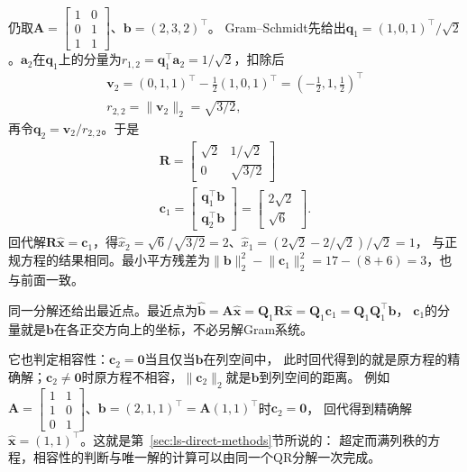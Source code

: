 \begin{example}[用QR分解求解最小二乘]
\label{ex:ls-qr-three-by-two}
仍取$\bm A=\left[\begin{smallmatrix}1&0\\0&1\\1&1\end{smallmatrix}\right]$、$\bm b=(2,3,2)^\top$。
Gram--Schmidt先给出$\bm q_1=(1,0,1)^\top/\sqrt2$。$\bm a_2$在$\bm q_1$上的分量为$r_{1,2}=\bm q_1^\top\bm a_2=1/\sqrt2$，扣除后
\[
 \begin{gathered}
\bm v_2=(0,1,1)^\top-\tfrac12(1,0,1)^\top=(-\tfrac12,1,\tfrac12)^\top\\
r_{2,2}=\lVert\bm v_2\rVert_2=\sqrt{3/2},
 \end{gathered}
\]
再令$\bm q_2=\bm v_2/r_{2,2}$。于是
\[
\begin{gathered}
\bm R=\begin{bmatrix}\sqrt2&1/\sqrt2\\0&\sqrt{3/2}\end{bmatrix}\\
\bm c_1=\begin{bmatrix}\bm q_1^\top\bm b\\\bm q_2^\top\bm b\end{bmatrix}=\begin{bmatrix}2\sqrt2\\\sqrt6\end{bmatrix}.
\end{gathered}
\]
回代解$\bm R\hat{\bm x}=\bm c_1$，得$\hat x_2=\sqrt6/\sqrt{3/2}=2$、$\hat x_1=(2\sqrt2-2/\sqrt2)/\sqrt2=1$，
与正规方程的结果相同。最小平方残差为$\lVert\bm b\rVert_2^2-\lVert\bm c_1\rVert_2^2=17-(8+6)=3$，也与前面一致。
\end{example}

同一分解还给出最近点。最近点为$\hat{\bm b}=\bm A\hat{\bm x}=\bm Q_1\bm R\hat{\bm x}=\bm Q_1\bm c_1=\bm Q_1\bm Q_1^\top\bm b$，
$\bm c_1$的分量就是$\bm b$在各正交方向上的坐标，不必另解Gram系统。

它也判定相容性：$\bm c_2=\bm0$当且仅当$\bm b$在列空间中，
此时回代得到的就是原方程的精确解；$\bm c_2\neq\bm0$时原方程不相容，$\lVert\bm c_2\rVert_2$就是$\bm b$到列空间的距离。
例如$\bm A=\left[\begin{smallmatrix}1&1\\1&0\\0&1\end{smallmatrix}\right]$、$\bm b=(2,1,1)^\top=\bm A(1,1)^\top$时$\bm c_2=\bm0$，
回代得到精确解$\hat{\bm x}=(1,1)^\top$。这就是第~\ref{sec:ls-direct-methods}节所说的：
超定而满列秩的方程，相容性的判断与唯一解的计算可以由同一个QR分解一次完成。

